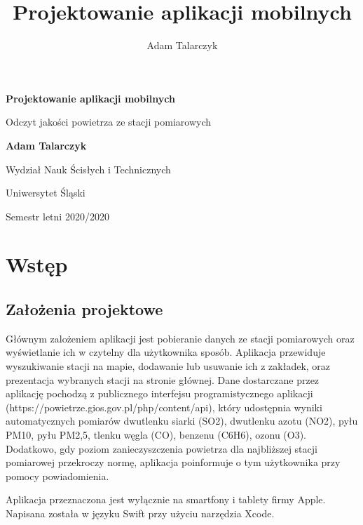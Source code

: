 \documentclass[a4paper,11pt,titlepage]{article}
\author{Adam Talarczyk}
\title{Projektowanie aplikacji mobilnych}
\begin{document}
\begin{titlepage}
    \begin{center}
        \vspace*{1cm}
 
        \Huge
        \textbf{Projektowanie aplikacji mobilnych}
 
        \vspace{0.5cm}
        \LARGE
        Odczyt jakości powietrza ze stacji pomiarowych
 
        \vspace{1.5cm}
 
        \textbf{Adam Talarczyk}
 
        \vfill
 
        \vspace{0.8cm}
 
        \Large
        Wydział Nauk Ścisłych i Technicznych
        
        Uniwersytet Śląski
        
        
		Semestr letni 2020/2020
 
    \end{center}
\end{titlepage}
\newpage
\tableofcontents
\newpage

\section{Wstęp}
\subsection{Założenia projektowe}
Głównym zalożeniem aplikacji jest pobieranie danych ze stacji pomiarowych oraz wyświetlanie ich w czytelny dla użytkownika sposób. Aplikacja przewiduje wyszukiwanie stacji na mapie, dodawanie lub usuwanie ich z zakładek, oraz prezentacja wybranych stacji na stronie głównej. Dane dostarczane przez aplikację pochodzą z publicznego interfejsu programistycznego aplikacji (https://powietrze.gios.gov.pl/php/content/api), który udostępnia wyniki automatycznych pomiarów dwutlenku siarki (SO2), dwutlenku azotu (NO2), pyłu PM10, pyłu PM2,5, tlenku węgla (CO), benzenu (C6H6), ozonu (O3). Dodatkowo, gdy poziom zanieczyszczenia powietrza dla najbliższej stacji pomiarowej przekroczy normę, aplikacja poinformuje o tym użytkownika przy pomocy powiadomienia.

Aplikacja przeznaczona jest wyłącznie na smartfony i tablety firmy Apple. Napisana została w języku Swift przy użyciu narzędzia Xcode.
\end{document}
